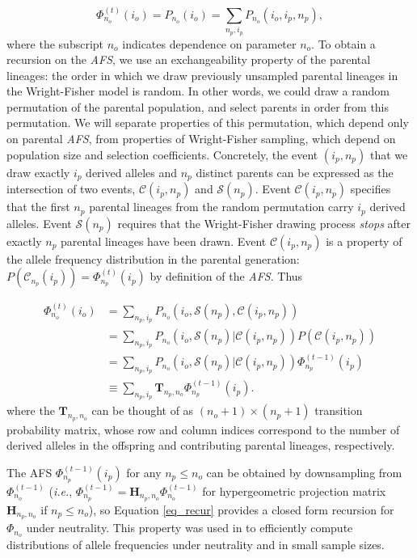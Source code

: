\documentclass[review]{elsarticle}
\newcommand{\afs}[2]{\Phi_{#1}^{(#2)}}
\begin{document}
\begin{equation}
  \afs{n_o}{t}(i_o)=P_{n_o} (i_o) =\sum_{n_p,i_p} P_{n_o}(i_o,i_p,n_p),
\end{equation}
where the subscript $n_o$ indicates dependence on parameter $n_o$. To obtain a recursion on the
\textit{AFS}, we use an exchangeability property of the parental lineages: the order
 in which we draw previously unsampled parental lineages in the Wright-Fisher
model is random. 
In other words, we could draw a random permutation of the parental population, and
select parents in order from this permutation. We will separate properties of this permutation,
which depend only on parental \textit{AFS}, from properties of Wright-Fisher sampling, which depend on population size and selection coefficients.
 Concretely, the event $(i_p,n_p)$ that we draw exactly $i_p$ derived alleles and $n_p$ distinct parents can be expressed as the intersection of two events, $\mathcal{C}(i_p,n_p)$
and $\mathcal{S}(n_p)$. Event $\mathcal{C}(i_p,n_p)$ specifies that the first $n_p$ parental
lineages from the random permutation carry $i_p$ derived alleles. Event $\mathcal{S}(n_p)$
requires that the Wright-Fisher drawing process \textit{stops} after exactly $n_p$ parental lineages
have been drawn. Event $\mathcal{C}(i_p, n_p)$ is a property of the allele frequency distribution 
in the parental generation: $P(\mathcal{C}_{n_p}(i_p)) =\afs{n_p}{t} (i_p)$ by definition of the \textit{AFS}. Thus 

\begin{equation}
  \begin{split}
    \afs{n_o}{t}(i_o)&= \sum_{n_p,i_p} P_{n_o}(i_o, \mathcal{S}(n_p), \mathcal{C}(i_p,n_p) )\\
    &=   \sum_{n_p,i_p} P_{n_o}(i_o, \mathcal{S}(n_p)| \mathcal{C}(i_p,n_p) ) P(\mathcal{C}(i_p,n_p))\\
    &=   \sum_{n_p,i_p} P_{n_o}(i_o, \mathcal{S}(n_p)| \mathcal{C}(i_p,n_p) )  \afs{n_p}{t-1}(i_p)\\
    &\equiv  \sum_{n_p,i_p}  \mathbf{T}_{n_p,n_o}     \afs{n_p}{t-1}(i_p).
  \end{split}
  \label{eq_recur}
\end{equation}
where the $\mathbf{T}_{n_p,n_o}$ can be thought of as $(n_o+1) \times (n_p+1)$ transition
probability matrix, whose row and column indices correspond to the number of derived alleles in the
offspring and contributing parental lineages, respectively.

The AFS  $\afs{n_p}{t-1}(i_p)$ for any  $n_p\leq n_o$ can be obtained by downsampling from $\afs{n_o}{t-1}$ (\textit{i.e.}, $\afs{n_p}{t-1} =
\mathbf{H}_{n_p,n_o} \afs{n_o}{t-1}$ for hypergeometric projection matrix $\mathbf{H}_{n_p,n_o}$ if
$n_p\leq n_o$), so Equation \eqref{eq_recur} provides a closed form recursion for $\Phi_{n_o}$ under neutrality.
This property was used in \cite{JouganousEtAl2017} to efficiently compute distributions of allele
frequencies under neutrality and in small sample sizes.
\end{document}
